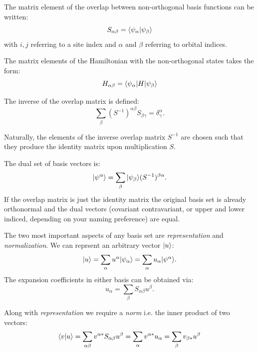 The matrix element of the overlap between non-orthogonal 
basis functions can be written:
%
\begin{equation}
S_{\alpha\beta} = \langle \psi_{\alpha}|\psi_{\beta}\rangle
\end{equation}
%
with $i,j$ referring to a site index and $\alpha$ and $\beta$ 
referring to orbital indices.

The matrix elements of the Hamiltonian with the non-orthogonal states takes
the form:
%
\begin{equation}
H_{\alpha \beta} = \langle \psi_{\alpha}|H|\psi_{\beta}\rangle
\end{equation}

The inverse of the overlap matrix is defined:
%
\begin{equation}
\sum_{\beta}(S^{-1})^{\alpha\beta}S_{\beta\gamma}=\delta^{\alpha}_{\gamma}.
\end{equation}
%

Naturally, the elements of the inverse overlap matrix $S^{-1}$ are chosen 
such that they produce the identity matrix upon multiplication $S$.

The dual set of basis vectors is:
%
\begin{equation}
|\psi^{\alpha}\rangle = \sum_{\beta}|\psi_{\beta}\rangle(S^{-1})^{\beta\alpha}.
\end{equation}
%
If the overlap matrix is just the identity matrix the original 
basis set is already orthonormal and the dual vectors (covariant
contravariant, or upper and lower indiced, depending
on your naming preference) are equal.

The two most important aspects of any basis set
are {\it representation} and {\it normalization}. 
We can reprsent an arbitrary vector $|u\rangle$:
%
\begin{equation}
|u\rangle = \sum_{\alpha}u^{\alpha}|\psi_{\alpha}\rangle = \sum_{\alpha}u_{\alpha}|\psi^{\alpha}\rangle.
\end{equation}
%
The expansion coefficients in either basis can be obtained via:
%
\begin{equation}
u_{\alpha} = \sum_{\beta}S_{\alpha\beta}u^{\beta}.
\end{equation}
%

Along with {\it representation} we require a {\it norm} i.e. 
the inner product of two vectors:
%
\begin{equation}
\langle v|u \rangle = \sum_{\alpha\beta}v^{\alpha *}S_{\alpha\beta}u^{\beta} = \sum_{\alpha}v^{\alpha *}u_{\alpha} = \sum_{\beta}v_{\beta *}u^{\beta}
\end{equation}
%

